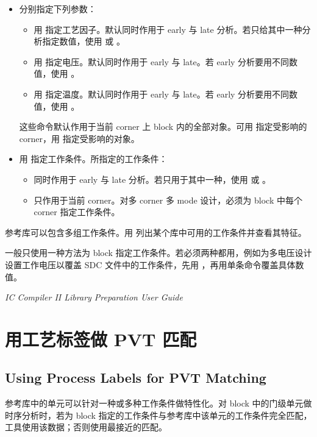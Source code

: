 \begin{itemize}
  \item 分别指定下列参数：
  \begin{itemize}
    \item 用  指定工艺因子。默认同时作用于 early 与 late 分析。若只给其中一种分析指定数值，使用  或 。
    \item 用  指定电压。默认同时作用于 early 与 late。若 early 分析要用不同数值，使用 。
    \item 用  指定温度。默认同时作用于 early 与 late。若 early 分析要用不同数值，使用 。
  \end{itemize}
        这些命令默认作用于当前 corner 上 block 内的全部对象。可用  指定受影响的 corner，用  指定受影响的对象。
  \item 用  指定工作条件。所指定的工作条件：
  \begin{itemize}
    \item 同时作用于 early 与 late 分析。若只用于其中一种，使用  或 。
    \item 只作用于当前 corner。对多 corner 多 mode 设计，必须为 block 中每个 corner 指定工作条件。
  \end{itemize}
\end{itemize}

参考库可以包含多组工作条件。用  列出某个库中可用的工作条件并查看其特征。

一般只使用一种方法为 block 指定工作条件。若必须两种都用，例如为多电压设计设置工作电压以覆盖 SDC 文件中的工作条件，先用 ，再用单条命令覆盖具体数值。

\begin{seeAlsoBox}
\textit{IC Compiler II Library Preparation User Guide}
\end{seeAlsoBox}

\section{用工艺标签做 PVT 匹配}
\subsection*{Using Process Labels for PVT Matching}

参考库中的单元可以针对一种或多种工作条件做特性化。对 block 中的门级单元做时序分析时，若为 block 指定的工作条件与参考库中该单元的工作条件完全匹配，工具使用该数据；否则使用最接近的匹配。

